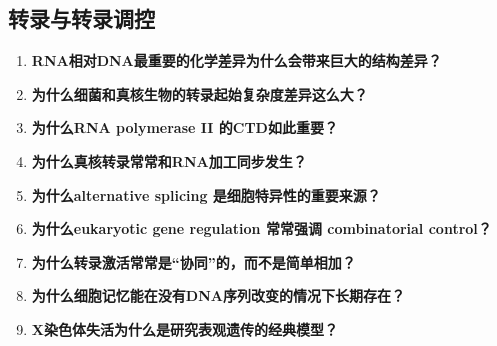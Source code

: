 \documentclass[12pt,fontset=none]{ctexart}
\begin{document}
\subsection*{转录与转录调控}
\begin{enumerate}
\item \textbf{RNA相对DNA最重要的化学差异为什么会带来巨大的结构差异？}

\item \textbf{为什么细菌和真核生物的转录起始复杂度差异这么大？}

\item \textbf{为什么RNA polymerase II 的CTD如此重要？}

\item \textbf{为什么真核转录常常和RNA加工同步发生？}

\item \textbf{为什么alternative splicing 是细胞特异性的重要来源？}

\item \textbf{为什么eukaryotic gene regulation 常常强调 combinatorial control？}

\item \textbf{为什么转录激活常常是“协同”的，而不是简单相加？}

\item \textbf{为什么细胞记忆能在没有DNA序列改变的情况下长期存在？}

\item \textbf{X染色体失活为什么是研究表观遗传的经典模型？}

\end{enumerate}



\end{document}
